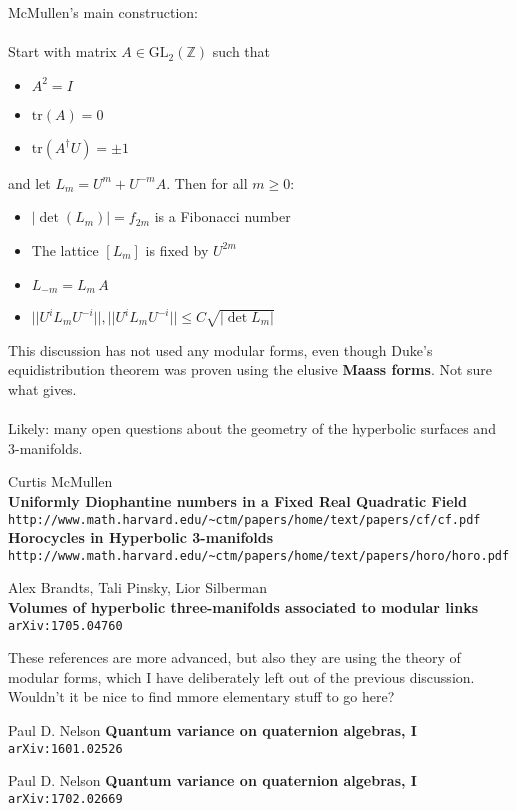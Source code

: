 \documentclass[12pt]{article}
\begin{document}
\newpage

\noindent McMullen's main construction: \\ \\
Start with matrix $A \in \mathrm{GL}_2(\mathbb{Z})$ such that
\begin{itemize}
\item $A^2 = I$
\item $\mathrm{tr}(A) = 0$
\item $\mathrm{tr}(A^\dagger U) = \pm 1$
\end{itemize}
and let $L_m = U^m + U^{-m} A $.  Then for all $m \geq 0$:
\begin{itemize}
\item $|\det (L_m)| = f_{2m}$ is a Fibonacci number
\item The lattice $[L_m]$ is fixed by $U^{2m}$ 
\item $L_{-m}= L_m \, A$ 
\item $\big|\big| U^i L_m U^{-i}\big|\big| , \big|\big| U^i L_m U^{-i}\big|\big|   \leq C \sqrt{|\det{L_m}|} $ 
\end{itemize}

\newpage 

\noindent This discussion has not used any modular forms, even though Duke's equidistribution theorem was proven using the elusive \textbf{Maass forms}.  Not sure what gives. \\ \\
Likely: many open questions about the geometry of the hyperbolic surfaces and 3-manifolds.

\vfill

\begin{thebibliography}{}

\item Curtis McMullen \\ \textbf{Uniformly Diophantine numbers in a
Fixed Real Quadratic Field} \texttt{http://www.math.harvard.edu/\~{}ctm/papers/home/text/papers/cf/cf.pdf} \\
\textbf{Horocycles in Hyperbolic 3-manifolds} \\ \texttt{http://www.math.harvard.edu/\~{}ctm/papers/home/text/papers/horo/horo.pdf}

\item Alex Brandts, Tali Pinsky, Lior Silberman \\ \textbf{Volumes of hyperbolic three-manifolds associated to modular links} \texttt{arXiv:1705.04760}

\end{thebibliography}
These references are more advanced, but also they are using the theory of modular forms, which I have deliberately left out of the previous discussion.  Wouldn't it be nice to find mmore elementary stuff to go here?
\begin{thebibliography}{}

\item Paul D. Nelson
\textbf{Quantum variance on quaternion algebras, I} \texttt{arXiv:1601.02526}

\item Paul D. Nelson
 \textbf{Quantum variance on quaternion algebras, I} \texttt{arXiv:1702.02669}

\end{thebibliography}
\end{document}
